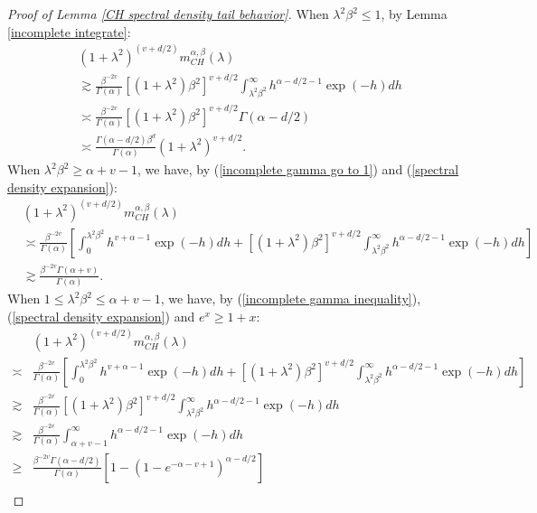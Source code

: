 \documentclass[ejs,noshowframe]{imsart}
\theoremstyle{plain}
\theoremstyle{definition}
\theoremstyle{remark}
\begin{document}
\begin{appendix}
\begin{proof}[Proof of Lemma \ref{CH spectral density tail behavior}]
When $\lambda^2 \beta^{2}\leq 1$, by Lemma \ref{incomplete integrate}:
\begin{displaymath}
\begin{split}
&(1+\lambda^2)^{(v+d/2)}m^{\alpha,\beta}_{CH}(\lambda) \\
&\gtrsim \frac{\beta^{-2v}}{\Gamma(\alpha)} [(1+\lambda^{2})\beta^{2}]^{v+d/2}\int_{\lambda^2\beta^2}^{\infty} h^{\alpha-d/2-1} \exp(-h) dh \\
&\asymp \frac{\beta^{-2v}}{\Gamma(\alpha)}[(1+\lambda^{2})\beta^{2}]^{v+d/2} \Gamma(\alpha-d/2)\\
&\asymp \frac{\Gamma(\alpha-d/2)\beta^{d}}{\Gamma(\alpha)}(1+\lambda^{2})^{v+d/2}. 
\end{split}
\end{displaymath}
When $ \lambda^2 \beta^{2} \geq \alpha+v-1 $, we have, by (\ref{incomplete gamma go to 1}) and (\ref{spectral density expansion}):
\begin{displaymath}
\begin{split}
&(1+\lambda^2)^{(v+d/2)}m^{\alpha,\beta}_{CH}(\lambda) \\
&\asymp \frac{\beta^{-2v}}{\Gamma(\alpha)} \left[\int_0^{\lambda^2\beta^2}  h^{v+\alpha-1} \exp(-h) dh
+[(1+\lambda^{2})\beta^{2}]^{v+d/2}\int_{\lambda^2\beta^2}^{\infty} h^{\alpha-d/2-1} \exp(-h) dh \right]\\
&\gtrsim \frac{\beta^{-2v}\Gamma(\alpha+v)}{\Gamma(\alpha)}.
\end{split}
\end{displaymath}
When $ 1\leq \lambda^2 \beta^{2} \leq \alpha+v-1 $, we have, by (\ref{incomplete gamma inequality}), (\ref{spectral density expansion})  and $e^x \ge 1+x$:
\begin{displaymath}
\begin{split}
&(1+\lambda^2)^{(v+d/2)}m^{\alpha,\beta}_{CH}(\lambda) \\
\asymp& \frac{\beta^{-2v}}{\Gamma(\alpha)} \left[\int_0^{\lambda^2\beta^2}  h^{v+\alpha-1} \exp(-h) dh
+[(1+\lambda^{2})\beta^{2}]^{v+d/2}\int_{\lambda^2\beta^2}^{\infty} h^{\alpha-d/2-1} \exp(-h) dh \right]\\
\gtrsim& \frac{\beta^{-2v}}{\Gamma(\alpha)}[(1+\lambda^{2})\beta^{2}]^{v+d/2}\int_{\lambda^2\beta^2}^{\infty} h^{\alpha-d/2-1} \exp(-h) dh\\
\gtrsim& \frac{\beta^{-2v}}{\Gamma(\alpha)}\int_{ \alpha+v-1}^{\infty} h^{\alpha-d/2-1} \exp(-h) dh\\
\geq& \frac{\beta^{-2v}\Gamma(\alpha-d/2)}{\Gamma(\alpha)}[1-(1-e^{- \alpha-v+1})^{\alpha-d/2}]\\

\end{split}
\end{displaymath}
\end{proof}
\end{appendix}
\end{document}
